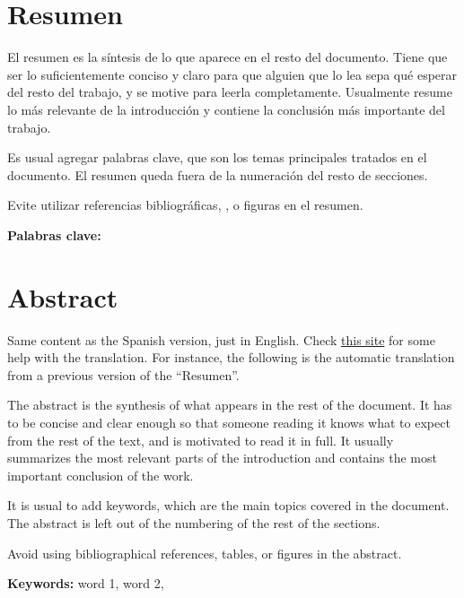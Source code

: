 \chapter*{Resumen}
\thispagestyle{empty}

El resumen es la síntesis de lo que aparece en el resto del
documento. Tiene que ser lo suficientemente conciso y claro para que
alguien que lo lea sepa qué esperar del resto del trabajo, y se motive
para leerla completamente.  Usualmente resume lo más relevante de la
introducción y contiene la conclusión más importante del trabajo.

Es usual agregar palabras clave, que son los temas principales
tratados en el documento. El resumen queda fuera de la numeración del
resto de secciones.

Evite utilizar referencias bibliográficas, \tablas, o figuras en el
resumen.

\bigskip

\textbf{Palabras clave:} \thesisKeywords

\clearpage
\chapter*{Abstract}
\thispagestyle{empty}

Same content as the Spanish version, just in English.  Check
\href{https://deepl.com}{this site} for some help with the
translation.  For instance, the following is the automatic translation
from a previous version of the ``Resumen''.

The abstract is the synthesis of what appears in the rest of the
document. It has to be concise and clear enough so that someone
reading it knows what to expect from the rest of the text, and is
motivated to read it in full.  It usually summarizes the most relevant
parts of the introduction and contains the most important conclusion of
the work.

It is usual to add keywords, which are the main topics covered in the
document. The abstract is left out of the numbering of the rest of the
sections.

Avoid using bibliographical references, tables, or figures in the
abstract.

\bigskip

\textbf{Keywords:} word 1, word 2, 

\cleardoublepage

